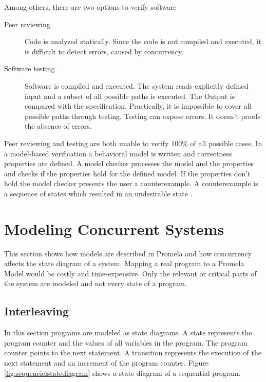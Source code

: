\documentclass[12pt,a4paper,twoside]{article}
\begin{document}
Among others, there are two options to verify software
\begin{description}
\item[Peer reviewing] Code is analyzed statically. Since the code is not compiled and executed, it is difficult to detect errors, caused by concurrency.
\item[Software testing] Software is compiled and executed. The system reads explicitly defined input and a subset of all possible paths is executed. The Output is compared with the specification. Practically, it is impossible to cover all possible paths through testing. Testing can expose errors. It doesn't proofs the absence of errors.
\end{description}

Peer reviewing and testing are both unable to verify 100\% of all possible cases. In a model-based verification a behavioral model is written and correctness properties are defined. A model checker processes the model and the properties and checks if the properties hold for the defined model. If the properties don't hold the model checker presents the user a counterexample. A counterexample is a sequence of states which resulted in an undesirable state \cite{baier08}.

\section{Modeling Concurrent Systems}
\label{sec:concurrency}

This section shows how models are described in Promela and how concurrency affects the state diagram of a system. Mapping a real program to a Promela Model would be costly and time-expensive. Only the relevant or critical parts of the system are modeled and not every state of a program.


\subsection{Interleaving}
\label{sec:interleaving}

In this section programs are modeled as state diagrams. A state represents the program counter and the values of all variables in the program. The program counter points to the next statement. A transition represents the execution of the next statement and an increment of the program counter. Figure \ref{fig:sequencielstatediagram} shows a state diagram of a sequential program. 
\end{document}
